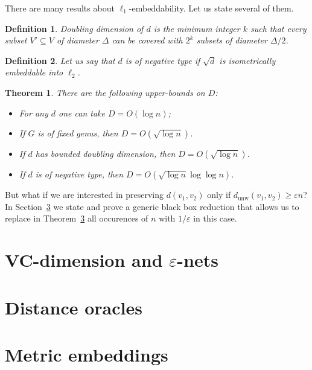 \documentclass{article}
\newcommand{\dunw}{d_{\mathrm{unw}}}
\newcommand{\eps}{\varepsilon}
\newtheorem{definition}{Definition}
\newtheorem{theorem}{Theorem}
\begin{document}
    There are many results about $\ell_1$-embeddability. Let us state several of them.

    \begin{definition}
        Doubling dimension of $d$ is the minimum integer $k$ such that every subset $V' \subseteq V$ of diameter $\Delta$
        can be covered with $2^k$ subsets of diameter $\Delta / 2$.
    \end{definition}

    \begin{definition}
        Let us say that $d$ is of negative type if $\sqrt{d}$ is isometrically embeddable into $\ell_2$.
    \end{definition}

    \begin{theorem}
        There are the following upper-bounds on $D$:
        \begin{itemize}
            \item \cite{B85} For any $d$ one can take $D = O(\log n)$;
            \item \cite{R99, IS07} If $G$ is of fixed genus, then $D = O(\sqrt{\log n})$. 
            \item \cite{GKL03} If $d$ has bounded doubling dimension, then $D = O(\sqrt{\log n})$.
            \item \cite{ALN05} If $d$ is of negative type, then $D = O(\sqrt{\log n} \log \log n)$. 
        \end{itemize}
    \end{theorem}

    But what if we are interested in preserving $d(v_1, v_2)$ only if $\dunw(v_1, v_2) \geq \eps n$?
    In Section~\ref{} we state and prove a generic black box reduction that allows us to replace in Theorem~\ref{} all occurences of $n$ with $1 / \eps$ in this
    case.
    \section{VC-dimension and $\eps$-nets}

    \section{Distance oracles}

    \section{Metric embeddings}

    
    
\end{document}
